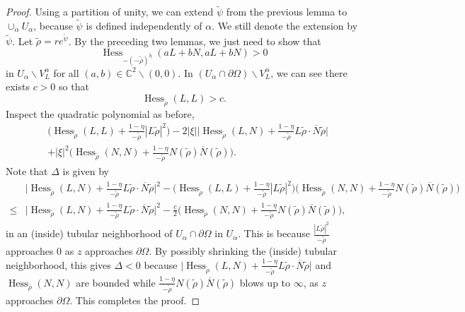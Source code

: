 \documentclass[11pt]{article}
\theoremstyle{plain} \numberwithin{equation}{section}
\theoremstyle{definition}
\DeclareMathOperator{\Hessian}{Hess}
\begin{document}
\begin{proof}
	Using a partition of unity, we can extend $\tilde{\psi}$ from the previous lemma to $\cup_{\alpha}U_\alpha$, because $\tilde{\psi}$ is defined independently of $\alpha$. We still denote the extension by $\tilde{\psi}$. Let $\tilde{\rho}=r e^{\tilde{\psi}}$. By the preceding two lemmas, we just need to show that  \[\Hessian_{-(-\tilde{\rho})^{\tilde{\eta}}}(aL+bN,aL+bN)>0\] in $U_\alpha\backslash V_L^\alpha$ for all $(a,b)\in\mathbb{C}^2\backslash(0,0)$. In $(U_\alpha\cap\partial\Omega)\backslash V_L^\alpha$, we can see there exists $c>0$ so that \[\Hessian_{\tilde{\rho}}(L, L)>c.\] Inspect the quadratic polynomial as before,
	\[\begin{split}
	&\Big(\Hessian_{\tilde{\rho}}(L, L)+\frac{1-\eta}{-\tilde{\rho}}|L\tilde{\rho}|^2\Big)-2|\xi| \Big|\Hessian_{\tilde{\rho}} (L, N)+\frac{1-\eta}{-\tilde{\rho}}L\tilde{\rho}\cdot\overline{N}\tilde{\rho}\Big|\\&+|\xi|^2 \Big(\Hessian_{\tilde{\rho}} (N, N)+\frac{1-\eta}{-\tilde{\rho}}N(\tilde{\rho})\overline{N} (\tilde{\rho})\Big).
	\end{split}\]
	Note that $\Delta$ is given by \[\begin{split}
	&\Big|\Hessian_{\tilde{\rho}} (L, N)+\frac{1-\eta}{-\tilde{\rho}}L\tilde{\rho}\cdot\overline{N}\tilde{\rho}\Big|^2-\Big(\Hessian_{\tilde{\rho}}(L, L)+\frac{1-\eta}{-\tilde{\rho}}|L\tilde{\rho}|^2\Big)\Big(\Hessian_{\tilde{\rho}} (N, N)+\frac{1-\eta}{-\tilde{\rho}}N(\tilde{\rho})\overline{N} (\tilde{\rho})\Big)\\\leq&\Big|\Hessian_{\tilde{\rho}} (L, N)+\frac{1-\eta}{-\tilde{\rho}}L\tilde{\rho}\cdot\overline{N}\tilde{\rho}\Big|^2-\frac{c}{2}\Big(\Hessian_{\tilde{\rho}} (N, N)+\frac{1-\eta}{-\tilde{\rho}}N(\tilde{\rho})\overline{N} (\tilde{\rho})\Big),
	\end{split}\]
	in an (inside) tubular neighborhood of $U_\alpha\cap\partial\Omega$ in $U_\alpha$. This is because $\frac{|L\tilde{\rho}|^2}{-\tilde{\rho}}$ approaches $0$ as $z$ approaches $\partial\Omega$. By possibly shrinking the (inside) tubular neighborhood, this gives $\Delta<0$ because $\Big|\Hessian_{\tilde{\rho}} (L, N)+\frac{1-\eta}{-\tilde{\rho}}L\tilde{\rho}\cdot\overline{N}\tilde{\rho}\Big|$ and $\Hessian_{\tilde{\rho}}(N, N)$ are bounded while $\frac{1-\eta}{-\tilde{\rho}}N(\tilde{\rho})\overline{N} (\tilde{\rho})$ blows up to $\infty$, as $z$ approaches $\partial\Omega$. This completes the proof.
\end{proof}
\end{document}
